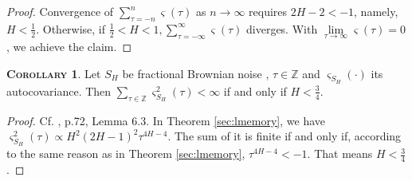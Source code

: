 \documentclass[a4paper, twoside, 11pt]{article}
\theoremstyle{definition}
\newtheorem{corollary}[definition]{\scshape Corollary}
\begin{document}
\begin{proof}

Convergence of $\sum\limits_{\tau=-n}^{n} \varsigma(\tau)$ as $n \rightarrow \infty$ requires $2H-2 < -1$, namely, $H < \frac{1}{2}$.
Otherwise, if $\frac{1}{2} < H < 1, \sum\limits_{\tau=-\infty}^{\infty} \varsigma(\tau) $ diverges. With $\lim\limits_{\tau\rightarrow \infty}\varsigma(\tau)=0$, we achieve the claim. 
\end{proof}

\begin{corollary}
  Let $S_H$ be fractional Brownian noise , $\tau\in\mathbb{Z}$ and $\varsigma_{S_H}(\cdot)$ its autocovariance. Then $\sum_{\tau\in\mathbb{Z}}\varsigma^2_{S_H}(\tau)<\infty$ if and only if $H < \frac{3}{4}$.
\end{corollary}
\begin{proof}
  Cf. \cite{nourdin}, p.72, Lemma 6.3. In Theorem \ref{sec:lmemory}, we have $\varsigma_{S_H}^2(\tau) \propto H^2(2H-1)^2\tau^{4H-4} $. The sum of it is finite if and only if, according to the same reason as in Theorem \ref{sec:lmemory}, $\tau^{4H-4}<-1$. That means $H < \frac{3}{4}$.
\end{proof}
\end{document}
